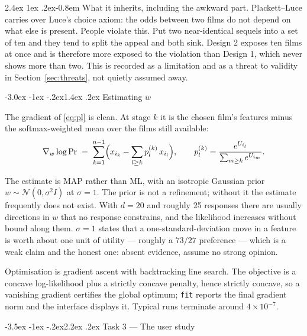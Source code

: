 \documentclass[11pt,a4paper]{article}
\makeatletter
\renewcommand\section{\@startsection{section}{1}{\z@}%
  {-3.5ex \@plus -1ex \@minus -.2ex}{2.2ex \@plus.2ex}%
  {\normalfont\Large\sffamily\bfseries\color{accent}}}
\renewcommand\subsection{\@startsection{subsection}{2}{\z@}%
  {-3.0ex \@plus -1ex \@minus -.2ex}{1.4ex \@plus .2ex}%
  {\normalfont\large\sffamily\bfseries\color{accent}}}
\renewcommand\paragraph{\@startsection{paragraph}{4}{\z@}%
  {2.4ex \@plus1ex \@minus.2ex}{-0.8em}%
  {\normalfont\normalsize\sffamily\bfseries\color{black}}}
\newcommand{\file}[1]{\texttt{\small #1}}
\makeatother
\begin{document}
\paragraph{What it inherits, including the awkward part.} Plackett--Luce carries
over Luce's choice axiom: the odds between two films do not depend on what else
is present. People violate this. Put two near-identical sequels into a set of ten
and they tend to split the appeal and both sink. Design 2 exposes ten films at
once and is therefore more exposed to the violation than Design 1, which never
shows more than two. This is recorded as a limitation and as a threat to validity
in Section~\ref{sec:threats}, not quietly assumed away.

\subsection{Estimating $w$}

The gradient of \eqref{eq:pl} is clean. At stage $k$ it is the chosen film's
features minus the softmax-weighted mean over the films still available:
\[
  \nabla_w \log \Pr \;=\; \sum_{k=1}^{n-1}
    \Bigl( x_{i_k} - \sum_{l \geq k} p^{(k)}_l\, x_{i_l} \Bigr),
  \qquad
  p^{(k)}_l = \frac{e^{U_{i_l}}}{\sum_{m \geq k} e^{U_{i_m}}} .
\]

The estimate is MAP rather than ML, with an isotropic Gaussian prior
$w \sim \mathcal{N}(0, \sigma^2 I)$ at $\sigma = 1$. The prior is not a
refinement; without it the estimate frequently does not exist. With $d = 20$ and
roughly 25 responses there are usually directions in $w$ that no response
constrains, and the likelihood increases without bound along them. $\sigma = 1$
states that a one-standard-deviation move in a feature is worth about one unit of
utility --- roughly a $73/27$ preference --- which is a weak claim and the honest
one: absent evidence, assume no strong opinion.

Optimisation is gradient ascent with backtracking line search. The objective is a
concave log-likelihood plus a strictly concave penalty, hence strictly concave, so
a vanishing gradient certifies the global optimum; \file{fit} reports the final
gradient norm and the interface displays it. Typical runs terminate around
$4\times10^{-7}$.

\section{Task 3 --- The user study}
\end{document}

